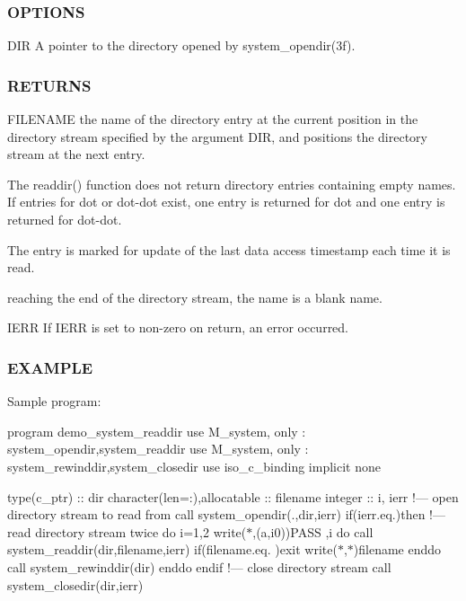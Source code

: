 \subsubsection*{O\+P\+T\+I\+O\+NS}

\begin{DoxyVerb}DIR       A pointer to the directory opened by system_opendir(3f).
\end{DoxyVerb}


\subsubsection*{R\+E\+T\+U\+R\+NS}

\begin{DoxyVerb}FILENAME  the name of the directory entry at the current position in
          the directory stream specified by the argument DIR, and
          positions the directory stream at the next entry.

          The readdir() function does not return directory entries
          containing empty names. If entries for dot or dot-dot exist,
          one entry is returned for dot and one entry is returned
          for dot-dot.

          The entry is marked for update of the last data access
          timestamp each time it is read.

          reaching the end of the directory stream, the name is a blank name.

IERR      If IERR is set to non-zero on return, an error occurred.
\end{DoxyVerb}


\subsubsection*{E\+X\+A\+M\+P\+LE}

Sample program\+:

program demo\+\_\+system\+\_\+readdir use M\+\_\+system, only \+: system\+\_\+opendir,system\+\_\+readdir use M\+\_\+system, only \+: system\+\_\+rewinddir,system\+\_\+closedir use iso\+\_\+c\+\_\+binding implicit none

type(c\+\_\+ptr) \+:\+: dir character(len=\+:),allocatable \+:\+: filename integer \+:\+: i, ierr !--- open directory stream to read from call system\+\_\+opendir(\textquotesingle{}.\textquotesingle{},dir,ierr) if(ierr.\+eq.)then !--- read directory stream twice do i=1,2 write($\ast$,\textquotesingle{}(a,i0)\textquotesingle{})\textquotesingle{}P\+A\+SS \textquotesingle{},i do call system\+\_\+readdir(dir,filename,ierr) if(filename.\+eq.\textquotesingle{} \textquotesingle{})exit write($\ast$,$\ast$)filename enddo call system\+\_\+rewinddir(dir) enddo endif !--- close directory stream call system\+\_\+closedir(dir,ierr)

